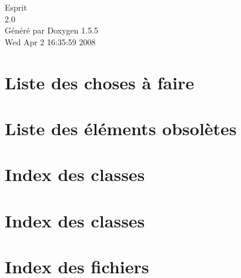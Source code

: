 \documentclass[a4paper]{book}
\begin{document}
\begin{titlepage}
\vspace*{7cm}
\begin{center}
{\Large Esprit \\[1ex]\large 2.0 }\\
\vspace*{1cm}
{\large Généré par Doxygen 1.5.5}\\
\vspace*{0.5cm}
{\small Wed Apr 2 16:35:59 2008}\\
\end{center}
\end{titlepage}
\clearemptydoublepage
{}
\tableofcontents
\clearemptydoublepage
{}
\chapter{Liste des choses à faire}

\chapter{Liste des éléments obsolètes}

\chapter{Index des classes}

\chapter{Index des classes}

\chapter{Index des fichiers}

\end{document}
